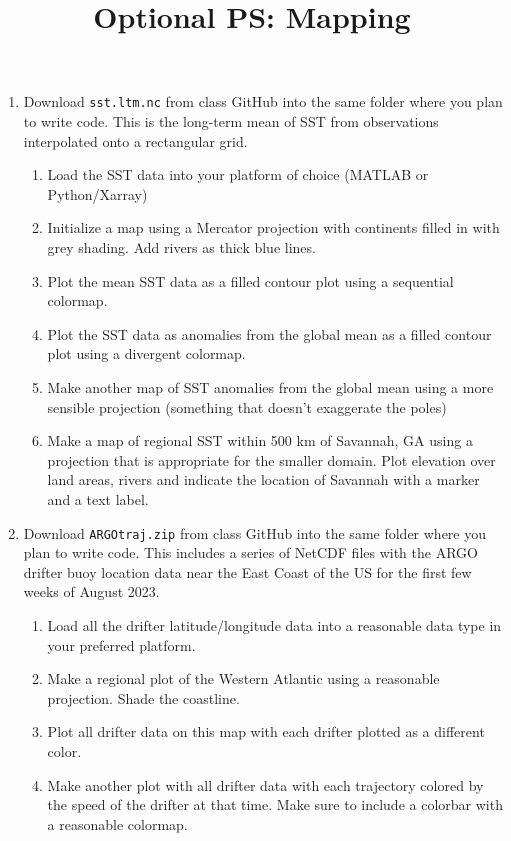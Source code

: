 \documentclass{article}
\title{\vspace{-1in} Optional PS: Mapping}
\newcommand{\be}{\begin{enumerate}}
\newcommand{\ee}{\end{enumerate}}
\begin{document}
\maketitle
\be 
\item Download \texttt{sst.ltm.nc} from class GitHub into the same folder where you plan to write code. This is the long-term mean of SST from observations interpolated onto a rectangular grid.

\be
\item Load the SST data into your platform of choice (MATLAB or Python/Xarray)

\item Initialize a map using a Mercator projection with continents filled in with grey shading. Add rivers as thick blue lines.

\item Plot the mean SST data as a filled contour plot using a sequential colormap.

\item Plot the SST data as anomalies from the global mean as a filled contour plot using a divergent colormap.

\item Make another map of SST anomalies from the global mean using a more sensible projection (something that doesn't exaggerate the poles)

\item Make a map of regional SST within 500 km of Savannah, GA using a projection that is appropriate for the smaller domain. Plot elevation over land areas, rivers and indicate the location of Savannah with a marker and a text label.
\ee

\item Download \texttt{ARGOtraj.zip} from class GitHub into the same folder where you plan to write code. This includes a series of NetCDF files with the ARGO drifter buoy location data near the East Coast of the US for the first few weeks of August 2023.

\be
\item Load all the drifter latitude/longitude data into a reasonable data type in your preferred platform.

\item Make a regional plot of the Western Atlantic using a reasonable projection. Shade the coastline.

\item Plot all drifter data on this map with each drifter plotted as a different color.

\item Make another plot with all drifter data with each trajectory colored by the speed of the drifter at that time. Make sure to include a colorbar with a reasonable colormap.

\ee

\ee
\end{document}
